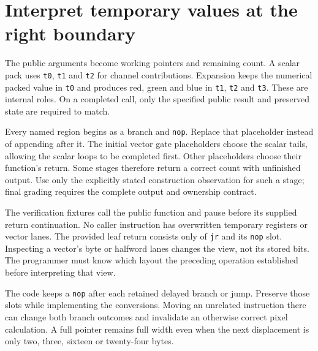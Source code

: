 \section{Interpret temporary values at the right boundary}\label{rgb-working-state}
The public arguments become working pointers and remaining count. A scalar pack
uses \texttt{t0}, \texttt{t1} and \texttt{t2} for channel contributions. Expansion
keeps the numerical packed value in \texttt{t0} and produces red, green and blue in
\texttt{t1}, \texttt{t2} and \texttt{t3}. These are internal roles. On a completed
call, only the specified public result and preserved state are required to match.

Every named region begins as a branch and \texttt{nop}. Replace that placeholder
instead of appending after it. The initial vector gate placeholders choose the
scalar tails, allowing the scalar loops to be completed first. Other placeholders
choose their function's return. Some stages therefore return a correct count with
unfinished output. Use only the explicitly stated construction observation for
such a stage; final grading requires the complete output and ownership contract.

The verification fixtures call the public function and pause before its supplied
return continuation. No caller instruction has overwritten temporary registers or
vector lanes. The provided leaf return consists only of \texttt{jr} and its
\texttt{nop} slot. Inspecting a vector's byte or halfword lanes changes the view,
not its stored bits. The programmer must know which layout the preceding operation
established before interpreting that view.

The code keeps a \texttt{nop} after each retained delayed branch or jump. Preserve
those slots while implementing the conversions. Moving an unrelated instruction
there can change both branch outcomes and invalidate an otherwise correct pixel
calculation. A full pointer remains full width even when the next displacement is
only two, three, sixteen or twenty-four bytes.
